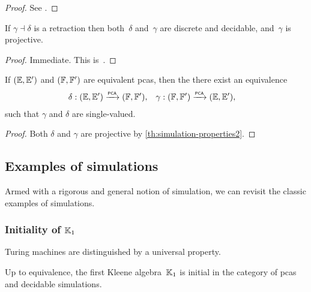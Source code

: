 \begin{proof}
  See \cite[Theorem 2.5.3]{Longley:94}.
\end{proof}

\begin{corollary}
  \label{th:simulation-properties}%
  If $\gamma \dashv \delta$ is a retraction then both~$\delta$
  and~$\gamma$ are discrete and decidable, and~$\gamma$ is projective.
\end{corollary}

\begin{proof}
  Immediate. This is~\cite[Corollary 2.5.4]{Longley:94}.
\end{proof}

\begin{corollary}
  \label{th:simulation-properties-more}%
  If $({\mathbb{E}}, {\mathbb{E}'})$ and $({\mathbb{F}}, {\mathbb{F}'})$ are equivalent pcas, then the 
  there exist an equivalence
  \begin{align*}
    \delta &: ({\mathbb{E}}, {\mathbb{E}'}) \xrightarrow{\scriptscriptstyle\mathsf{PCA}}{} ({\mathbb{F}}, {\mathbb{F}'}),
    &
    \gamma &: ({\mathbb{F}}, {\mathbb{F}'}) \xrightarrow{\scriptscriptstyle\mathsf{PCA}}{} ({\mathbb{E}}, {\mathbb{E}'}),
  \end{align*}
  such that $\gamma$ and $\delta$ are single-valued.
\end{corollary}

\begin{proof}
  Both $\delta$ and $\gamma$ are projective by
  \cref{th:simulation-properties2}.
\end{proof}

\subsection{Examples of simulations}
\label{sec:examples-simulations}

Armed with a rigorous and general notion of simulation, we can revisit the classic examples of simulations.

\subsubsection{Initiality of $\mathbb{K}_1$}
\label{ex:intiality-K1}%

Turing machines are distinguished by a universal property.

\begin{theorem}
  Up to equivalence, the first Kleene algebra~$\mathbb{K}_1$ is initial in the category of pcas and decidable simulations.
\end{theorem}

